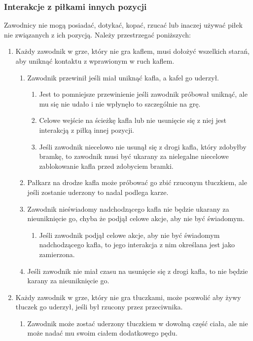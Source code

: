 \documentclass[11pt,a4paper]{article}
\begin{document}
\subsubsection{Interakcje z piłkami innych pozycji}
Zawodnicy nie mogą posiadać, dotykać, kopać, rzucać lub inaczej używać piłek nie związanych z ich pozycją. Należy przestrzegać poniższych:
\begin{enumerate}
  \item Każdy zawodnik w grze, który nie gra kaflem, musi dołożyć wszelkich starań, aby uniknąć kontaktu z wprawionym w ruch kaflem.
  \begin{enumerate}
    \item Zawodnik przewinił jeśli miał uniknąć kafla, a kafel go uderzył.
    \begin{enumerate}
      \item Jest to pomniejsze przewinienie jeśli zawodnik próbował uniknąć, ale mu się nie udało i nie wpłynęło to szczególnie na grę.
      \item Celowe wejście na ścieżkę kafla lub nie usunięcie się z niej jest interakcją z piłką innej pozycji.
      \item Jeśli zawodnik niecelowo nie usunął się z drogi kafla, który zdobyłby bramkę, to zawodnik musi być ukarany za nielegalne niecelowe zablokowanie kafla przed zdobyciem bramki.
    \end{enumerate}
    \item Pałkarz na drodze kafla może próbować go zbić rzuconym tłuczkiem, ale jeśli zostanie uderzony to nadal podlega karze.
    \item Zawodnik nieświadomy nadchodzącego kafla nie będzie ukarany za nieuniknięcie go, chyba że podjął celowe akcje, aby nie być świadomym.
    \begin{enumerate}
      \item Jeśli zawodnik podjął celowe akcje, aby nie być świadomym nadchodzącego kafla, to jego interakcja z nim określana jest jako zamierzona.
    \end{enumerate}
    \item Jeśli zawodnik nie miał czasu na usunięcie się z drogi kafla, to nie będzie karany za nieuniknięcie go.
  \end{enumerate}
  \item Każdy zawodnik w grze, który nie gra tłuczkami, może pozwolić aby żywy tłuczek go uderzył, jeśli był rzucony przez przeciwnika.
  \begin{enumerate}
    \item Zawodnik może zostać uderzony tłuczkiem w dowolną część ciała, ale nie może nadać mu swoim ciałem dodatkowego pędu.

\end{enumerate}
\end{enumerate}
\end{document}
